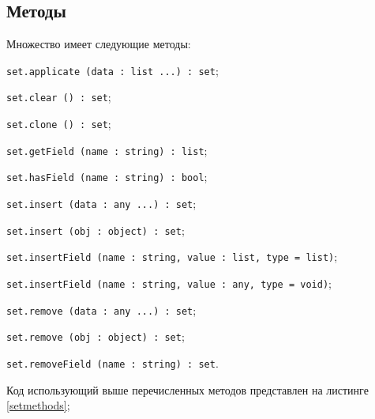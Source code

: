 \subsection{Методы}

Множество имеет следующие методы:
\begin{icItems}
\item \texttt{set.applicate (data : list ...) : set};
\item \texttt{set.clear () : set};
\item \texttt{set.clone () : set};
\item \texttt{set.getField (name : string) : list};
\item \texttt{set.hasField (name : string) : bool};
\item \texttt{set.insert (data : any ...) : set};
\item \texttt{set.insert (obj : object) : set};
\item \texttt{set.insertField (name : string, value : list, type = list)};
\item \texttt{set.insertField (name : string, value : any, type = void)};
\item \texttt{set.remove (data : any ...) : set};
\item \texttt{set.remove (obj : object) : set};
\item \texttt{set.removeField (name : string) : set}.
\end{icItems}

Код использующий выше перечисленных методов представлен на листинге \ref{setmethods};

